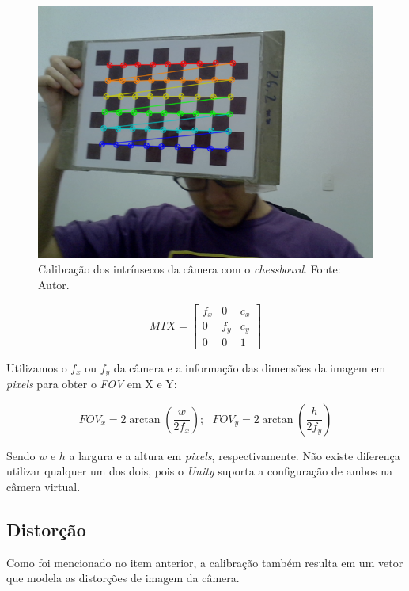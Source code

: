 \begin{figure}[ht]
    \centering
    \includegraphics[width=.45\linewidth]{figuras/chessboard.png}
    \caption{Calibração dos intrínsecos da câmera com o \textit{chessboard}. Fonte: Autor.}
    \label{fig:chess_calib}
\end{figure}

\[ MTX = 
\begin{bmatrix}
    f_x & 0 & c_x \\
    0 & f_y & c_y \\
    0 & 0 & 1
\end{bmatrix} \]

Utilizamos o \(f_x\) ou \(f_y\) da câmera e a informação das dimensões da imagem em \textit{pixels} para obter o \textit{FOV} em X e Y: 

\[
FOV_x = 2 \arctan \left( \dfrac{w}{2f_x} \right) ;
\ \ \ FOV_y = 2 \arctan \left( \dfrac{h}{2f_y} \right) 
\]
    
Sendo \(w\) e \(h\) a largura e a altura em \textit{pixels}, respectivamente. Não existe diferença utilizar qualquer um dos dois, pois o \textit{Unity} suporta a configuração de ambos na câmera virtual.
    
\subsection{Distorção}

Como foi mencionado no item anterior, a calibração também resulta em um vetor que modela as distorções de imagem da câmera. 


    
    

